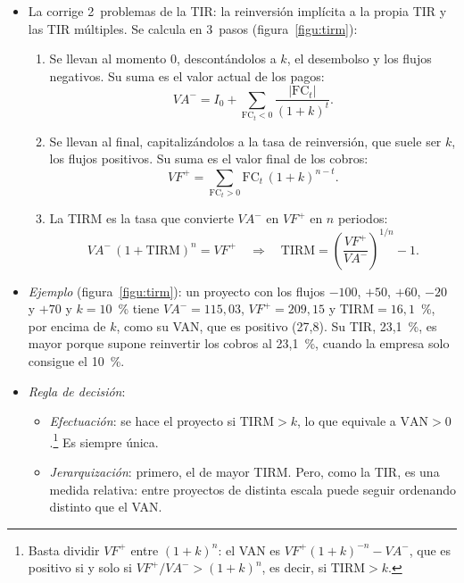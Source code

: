 \documentclass[11pt]{article}
\begin{document}
\begin{itemize}
\item La  corrige 2~problemas de la TIR: la reinversión implícita a la propia TIR y las TIR múltiples. Se calcula en 3~pasos (figura~\ref{figu:tirm}):
  \begin{enumerate}
  \item Se llevan al momento 0, descontándolos a $k$, el desembolso y los flujos negativos. Su suma es el valor actual de los pagos:
    \[
    VA^{-}=I_0+\sum_{\mathrm{FC}_t<0}\frac{|\mathrm{FC}_t|}{(1+k)^{t}}.
    \]
  \item Se llevan al final, capitalizándolos a la tasa de reinversión, que suele ser $k$, los flujos positivos. Su suma es el valor final de los cobros:
    \[
    VF^{+}=\sum_{\mathrm{FC}_t>0}\mathrm{FC}_t\,(1+k)^{n-t}.
    \]
  \item La TIRM es la tasa que convierte $VA^{-}$ en $VF^{+}$ en $n$ periodos:
    \[
    VA^{-}\,(1+\mathrm{TIRM})^n=VF^{+}\quad\Longrightarrow\quad\mathrm{TIRM}=\left(\frac{VF^{+}}{VA^{-}}\right)^{1/n}-1.
    \]
  \end{enumerate}
\item \emph{Ejemplo} (figura~\ref{figu:tirm}): un proyecto con los flujos $-100$, $+50$, $+60$, $-20$ y $+70$ y $k=10$~\% tiene $VA^{-}=115{,}03$, $VF^{+}=209{,}15$ y $\mathrm{TIRM}=16{,}1$~\%, por encima de $k$, como su VAN, que es positivo (27,8). Su TIR, 23,1~\%, es mayor porque supone reinvertir los cobros al 23,1~\%, cuando la empresa solo consigue el 10~\%.
\item \emph{Regla de decisión}:
  \begin{itemize}
  \item \emph{Efectuación}: se hace el proyecto si $\mathrm{TIRM}>k$, lo que equivale a $\mathrm{VAN}>0$.\footnote{Basta dividir $VF^{+}$ entre $(1+k)^n$: el VAN es $VF^{+}(1+k)^{-n}-VA^{-}$, que es positivo si y solo si $VF^{+}/VA^{-}>(1+k)^n$, es decir, si $\mathrm{TIRM}>k$.} Es siempre única.
  \item \emph{Jerarquización}: primero, el de mayor TIRM. Pero, como la TIR, es una medida relativa: entre proyectos de distinta escala puede seguir ordenando distinto que el VAN\nocite{BrealeyMyersAllen2020Principles}.
  \end{itemize}
\end{itemize}

\begin{infografia}[H]
\centering
\caption{La TIR modificada en 3~pasos, con un ejemplo}\label{figu:tirm}
\end{infografia}
\end{document}
